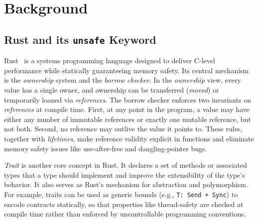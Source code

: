 

\section{Background}
\label{sec:background}

\subsection{Rust and its \texttt{unsafe} Keyword}

Rust~\cite{TODO:rust_book} is a systems programming language designed to
deliver C-level performance while statically guaranteeing memory safety.
Its central mechanism is the \emph{ownership} system and the \emph{borrow checker}.
In the \emph{ownership} view, every value has a single owner, and ownership can be transferred (\emph{moved}) or temporarily loaned via \emph{references}.
The borrow checker enforces two invariants on \emph{references} at compile time. 
First, at any point in the program, a value may have either any number of immutable references or exactly one mutable reference, but not both. Second, no reference may outlive the value it points to.
These rules, together with \emph{lifetimes}, make reference validity explicit in functions and eliminate memory safety issues like use-after-free and dangling-pointer bugs.


\emph{Trait} is another core concept in Rust. It declares a set of methods or associated types that a type should implement and improve the extensibility of the type's behavior. It also serves as Rust's mechanism for abstraction and polymorphism.
For example, traits can be used as generic bounds (e.g., \texttt{T:~Send + Sync}) to
encode contracts statically, so that properties like thread-safety are checked at compile time rather than enforced by uncontrollable programming conventions.

